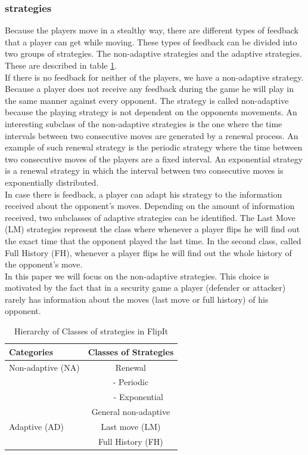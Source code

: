 \documentclass[journal,a4paper]{IEEEtran}
\begin{document}
\subsubsection{strategies}
Because the players move in a stealthy way, there are different types of feedback that a player can get while moving. These types of feedback can be divided into two groups of strategies. The non-adaptive strategies and the adaptive strategies. These are described in table \ref{table:Strategies}. \\

If there is no feedback for neither of the players, we have a non-adaptive strategy. Because a player does not receive any feedback during the game he will play in the same manner against every opponent. The strategy is called non-adaptive because the playing strategy is not dependent on the opponents movements. An interesting subclass of the non-adaptive strategies is the one where the time intervals between two consecutive moves are generated by a renewal process. An example of such renewal strategy is the periodic strategy where the time between two consecutive moves of the players are a fixed interval. An exponential strategy is a renewal strategy in which the interval between two consecutive moves is exponentially distributed. \\
In case there is feedback, a player can adapt his strategy to the information received about the opponent's moves. Depending on the amount of information received, two subclasses of adaptive strategies can be identified. The Last Move (LM) strategies represent the class where whenever a player flips he will find out the exact time that the opponent played the last time. In the second class, called Full History (FH), whenever a player flips he will find out the whole history of the opponent's move. \\
In this paper we will focus on the non-adaptive strategies. This choice is motivated by the fact that in a security game a player (defender or attacker) rarely has information about the moves (last move or full history) of his opponent.  \\


 \begin{table}
 \centering
 \begin{tabular}{ l | c  }
  \textbf{Categories} & \textbf{Classes of Strategies} \\
  \hline Non-adaptive (NA) & Renewal \\
  & - Periodic \\
  & ~~~ - Exponential \\
  & General non-adaptive \\
  \hline Adaptive (AD) & Last move (LM) \\
  & Full History (FH) \\  
\end{tabular}
 \caption{Hierarchy of Classes of strategies in FlipIt}
 \label{table:Strategies}
 \end{table}
\end{document}
